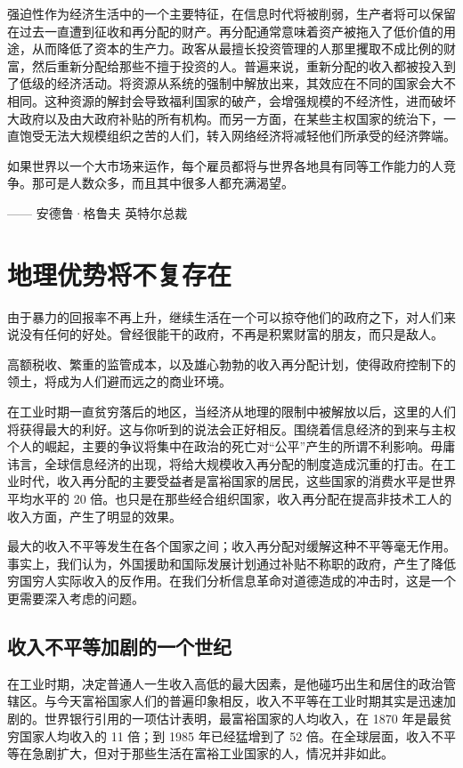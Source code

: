 强迫性作为经济生活中的一个主要特征，在信息时代将被削弱，生产者将可以保留在过去一直遭到征收和再分配的财产。再分配通常意味着资产被拖入了低价值的用途，从而降低了资本的生产力。政客从最擅长投资管理的人那里攫取不成比例的财富，然后重新分配给那些不擅于投资的人。普遍来说，重新分配的收入都被投入到了低级的经济活动。将资源从系统的强制中解放出来，其效应在不同的国家会大不相同。这种资源的解封会导致福利国家的破产，会增强规模的不经济性，进而破坏大政府以及由大政府补贴的所有机构。而另一方面，在某些主权国家的统治下，一直饱受无法大规模组织之苦的人们，转入网络经济将减轻他们所承受的经济弊端。

\begin{tcolorbox}
如果世界以一个大市场来运作，每个雇员都将与世界各地具有同等工作能力的人竞争。那可是人数众多，而且其中很多人都充满渴望。
\begin{flushright}
—— 安德鲁·格鲁夫 英特尔总裁
\end{flushright}
\end{tcolorbox}


\section{地理优势将不复存在}
由于暴力的回报率不再上升，继续生活在一个可以掠夺他们的政府之下，对人们来说没有任何的好处。曾经很能干的政府，不再是积累财富的朋友，而只是敌人。

高额税收、繁重的监管成本，以及雄心勃勃的收入再分配计划，使得政府控制下的领土，将成为人们避而远之的商业环境。

在工业时期一直贫穷落后的地区，当经济从地理的限制中被解放以后，这里的人们将获得最大的利好。这与你听到的说法会正好相反。围绕着信息经济的到来与主权个人的崛起，主要的争议将集中在政治的死亡对“公平”产生的所谓不利影响。毋庸讳言，全球信息经济的出现，将给大规模收入再分配的制度造成沉重的打击。在工业时代，收入再分配的主要受益者是富裕国家的居民，这些国家的消费水平是世界平均水平的 20 倍。也只是在那些经合组织国家，收入再分配在提高非技术工人的收入方面，产生了明显的效果。

最大的收入不平等发生在各个国家之间；收入再分配对缓解这种不平等毫无作用。事实上，我们认为，外国援助和国际发展计划通过补贴不称职的政府，产生了降低穷国穷人实际收入的反作用。在我们分析信息革命对道德造成的冲击时，这是一个更需要深入考虑的问题。

\subsection{收入不平等加剧的一个世纪}
在工业时期，决定普通人一生收入高低的最大因素，是他碰巧出生和居住的政治管辖区。与今天富裕国家人们的普遍印象相反，收入不平等在工业时期其实是迅速加剧的。世界银行引用的一项估计表明，最富裕国家的人均收入，在 1870 年是最贫穷国家人均收入的 11 倍；到 1985 年已经猛增到了 52 倍。在全球层面，收入不平等在急剧扩大，但对于那些生活在富裕工业国家的人，情况并非如此。


